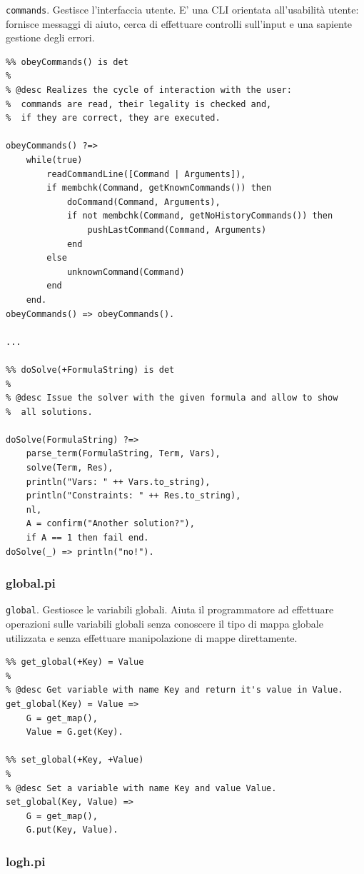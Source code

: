 \documentclass[12pt,a4paper,openright]{book} %
\begin{document}
\verb|commands|. Gestisce l'interfaccia utente. E' una CLI orientata all'usabilità utente: fornisce messaggi di aiuto, cerca di effettuare controlli sull'input e una sapiente gestione degli errori.

\begin{verbatim}
%% obeyCommands() is det
% 
% @desc Realizes the cycle of interaction with the user:
%  commands are read, their legality is checked and,
%  if they are correct, they are executed.

obeyCommands() ?=>
    while(true)
        readCommandLine([Command | Arguments]),
        if membchk(Command, getKnownCommands()) then
            doCommand(Command, Arguments),
            if not membchk(Command, getNoHistoryCommands()) then
                pushLastCommand(Command, Arguments)    
            end
        else 
            unknownCommand(Command)
        end
    end.
obeyCommands() => obeyCommands().

...

%% doSolve(+FormulaString) is det
%
% @desc Issue the solver with the given formula and allow to show
%  all solutions.

doSolve(FormulaString) ?=>
    parse_term(FormulaString, Term, Vars),
    solve(Term, Res),
    println("Vars: " ++ Vars.to_string),
    println("Constraints: " ++ Res.to_string),
    nl,
    A = confirm("Another solution?"),
    if A == 1 then fail end.
doSolve(_) => println("no!").
\end{verbatim}

\subsubsection{global.pi}

\verb|global|. Gestiosce le variabili globali. Aiuta il programmatore ad effettuare operazioni sulle variabili globali senza conoscere il tipo di mappa globale utilizzata e senza effettuare manipolazione di mappe direttamente.

\begin{verbatim}
%% get_global(+Key) = Value
%
% @desc Get variable with name Key and return it's value in Value.
get_global(Key) = Value =>
    G = get_map(),
    Value = G.get(Key).

%% set_global(+Key, +Value)
%
% @desc Set a variable with name Key and value Value.
set_global(Key, Value) =>
    G = get_map(),
    G.put(Key, Value).
\end{verbatim}

\subsubsection{log\textunderscore h.pi}
\end{document}
